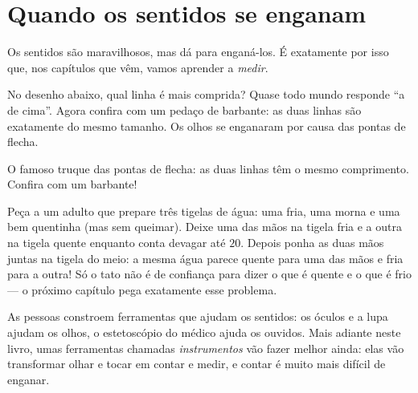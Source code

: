 \section{Quando os sentidos se enganam}

Os sentidos são maravilhosos, mas dá para enganá-los. É exatamente
por isso que, nos capítulos que vêm, vamos aprender a \emph{medir}.

\begin{example}\label{ex:g1:five-senses:lines}
No desenho abaixo, qual linha é mais comprida? Quase todo mundo
responde ``a de cima''. Agora confira com um pedaço de barbante: as
duas linhas são exatamente do mesmo tamanho. Os olhos se enganaram
por causa das pontas de flecha.
\end{example}

\begin{omfigure}

{\small O famoso truque das pontas de flecha: as duas linhas têm o
mesmo comprimento. Confira com um barbante!}
\end{omfigure}

\begin{example}\label{ex:g1:five-senses:bowls}
Peça a um adulto que prepare três tigelas de água: uma fria, uma
morna e uma bem quentinha (mas sem queimar). Deixe uma das mãos na
tigela fria e a outra na tigela quente enquanto conta devagar até
$20$. Depois ponha as duas mãos juntas na tigela do meio: a mesma
água parece quente para uma das mãos e fria para a outra! Só o tato
não é de confiança para dizer o que é quente e o que é frio --- o
próximo capítulo pega exatamente esse problema.
\end{example}

\begin{remark}\label{rem:g1:five-senses:tools}
As pessoas constroem ferramentas que ajudam os sentidos: os óculos e
a lupa ajudam os olhos, o estetoscópio do médico ajuda os ouvidos.
Mais adiante neste livro, umas ferramentas chamadas
\emph{instrumentos} vão fazer melhor ainda: elas vão transformar
olhar e tocar em contar e medir, e contar é muito mais difícil de
enganar.
\end{remark}

